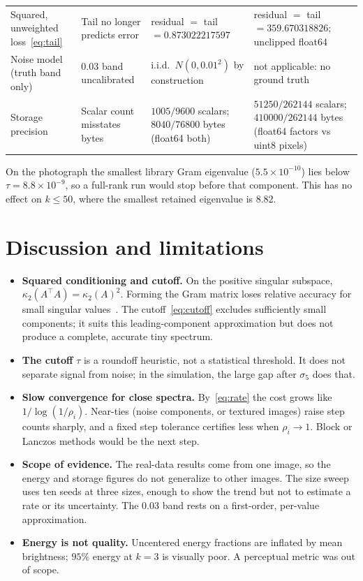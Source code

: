 \documentclass[11pt,letterpaper]{article}
\numberwithin{equation}{section}
\begin{document}
\begin{table}[H]
\begin{tabularx}{\linewidth}{@{}P{2.5cm} P{3.1cm} L L@{}}
Squared, unweighted loss~\eqref{eq:tail} & Tail no longer predicts error & residual $=$ tail $=0.873022217597$ & residual $=$ tail $=359.670318826$; unclipped float64\\
Noise model (truth band only) & $0.03$ band uncalibrated & i.i.d.\ $N(0,0.01^2)$ by construction & not applicable: no ground truth\\
Storage precision & Scalar count misstates bytes & $1005/9600$ scalars; $8040/76800$ bytes (float64 both) & $51250/262144$ scalars; $410000/262144$ bytes (float64 factors vs uint8 pixels)\\\bottomrule
\end{tabularx}
\end{table}

On the photograph the smallest library Gram eigenvalue ($5.5\times10^{-10}$) lies below $\tau=8.8\times10^{-9}$, so a full-rank run would stop before that component. This has no effect on $k\le50$, where the smallest retained eigenvalue is $8.82$.

\section{Discussion and limitations}\label{sec:discuss}
\begin{itemize}[leftmargin=1.2em]
\item \textbf{Squared conditioning and cutoff.} On the positive singular subspace, $\kappa_2(A^\top A)=\kappa_2(A)^2$. Forming the Gram matrix loses relative accuracy for small singular values~\cite{trefethen1997,golub2013}. The cutoff~\eqref{eq:cutoff} excludes sufficiently small components; it suits this leading-component approximation but does not produce a complete, accurate tiny spectrum.
\item \textbf{The cutoff} $\tau$ is a roundoff heuristic, not a statistical threshold. It does not separate signal from noise; in the simulation, the large gap after $\sigma_5$ does that.
\item \textbf{Slow convergence for close spectra.} By~\eqref{eq:rate} the cost grows like $1/\log(1/\rho_i)$. Near-ties (noise components, or textured images) raise step counts sharply, and a fixed step tolerance certifies less when $\rho_i\to1$. Block or Lanczos methods would be the next step.
\item \textbf{Scope of evidence.} The real-data results come from one image, so the energy and storage figures do not generalize to other images. The size sweep uses ten seeds at three sizes, enough to show the trend but not to estimate a rate or its uncertainty. The $0.03$ band rests on a first-order, per-value approximation.
\item \textbf{Energy is not quality.} Uncentered energy fractions are inflated by mean brightness; $95\%$ energy at $k=3$ is visually poor. A perceptual metric was out of scope.
\end{itemize}
\end{document}
